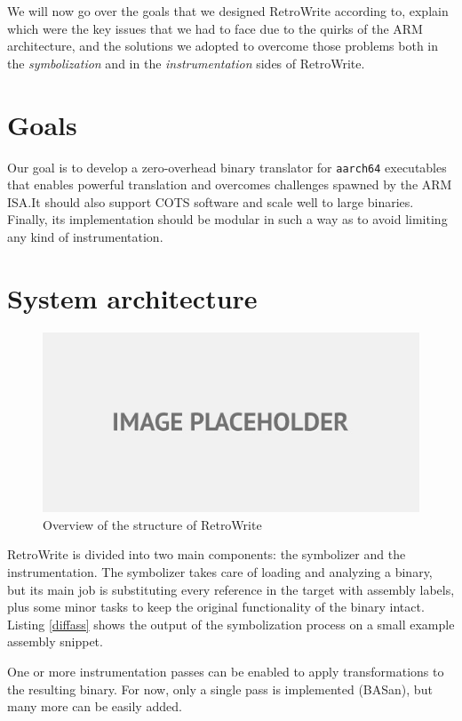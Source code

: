 \documentclass[a4paper,11pt,oneside]{report}
\newcommand{\sysname}{RetroWrite\xspace}
\begin{document}
We will now go over the goals that we designed \sysname according to, explain
which were the key issues that we had to face due to the quirks of the ARM
architecture, and the solutions we adopted to overcome those problems both in
the \emph{symbolization} and in the \emph{instrumentation} sides of \sysname.


\section{Goals}

Our goal is to develop a zero-overhead binary translator for \texttt{aarch64} 
executables that enables powerful translation and overcomes challenges spawned 
by the ARM ISA.\@ It should also support COTS software and scale well to large 
binaries. Finally, its implementation should be modular in such a way as to 
avoid limiting any kind of instrumentation.


\section{System architecture}

\begin{figure}[h]
\includegraphics[width=15cm]{symbolizer.jpg}
\centering
\caption{Overview of the structure of \sysname}
\end{figure}

\sysname is divided into two main components: the symbolizer and the 
instrumentation.  The symbolizer takes care of loading and analyzing a binary, 
but its main job is substituting every reference in the target with assembly 
labels, plus some minor tasks to keep the original functionality of the binary 
intact. 
Listing \ref{diffass}  shows the output of the symbolization process on a
small example assembly snippet.

One or more instrumentation passes can be enabled to apply 
transformations to the resulting binary. For now, only a single pass is 
implemented (BASan), but many more can be easily added.
\end{document}
